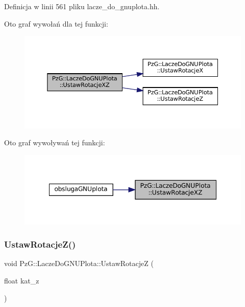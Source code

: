 Definicja w linii 561 pliku lacze\+\_\+do\+\_\+gnuplota.\+hh.

Oto graf wywołań dla tej funkcji\+:\nopagebreak
\begin{figure}[H]
\begin{center}
\leavevmode
\includegraphics[width=350pt]{class_pz_g_1_1_lacze_do_g_n_u_plota_a94d8527fd78048ed6cb32ffb29e5f903_cgraph}
\end{center}
\end{figure}
Oto graf wywoływań tej funkcji\+:\nopagebreak
\begin{figure}[H]
\begin{center}
\leavevmode
\includegraphics[width=348pt]{class_pz_g_1_1_lacze_do_g_n_u_plota_a94d8527fd78048ed6cb32ffb29e5f903_icgraph}
\end{center}
\end{figure}
\mbox{\label{class_pz_g_1_1_lacze_do_g_n_u_plota_a458399aa2a8f4b3f00ccd5b272857ea1}} 
\subsubsection{\texorpdfstring{UstawRotacjeZ()}{UstawRotacjeZ()}}
{\footnotesize\ttfamily void Pz\+G\+::\+Lacze\+Do\+G\+N\+U\+Plota\+::\+Ustaw\+RotacjeZ (\begin{DoxyParamCaption}\item[{float}]{kat\+\_\+z }\end{DoxyParamCaption})\hspace{0.3cm}{\ttfamily [inline]}}

